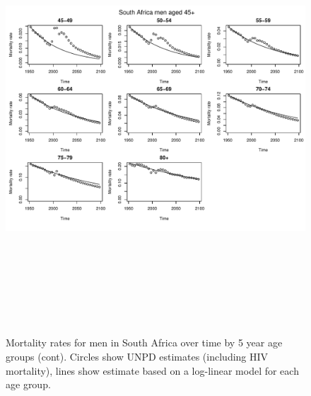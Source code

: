 \documentclass{article}
\begin{document}
\begin{figure}
\includegraphics[width=16cm,height=16cm]{EstimatingRatesFromUNPD-MortalitySAMen2} 

\caption{Mortality rates for men in South Africa over time by 5 year age groups (cont). Circles show UNPD estimates (including HIV mortality), lines show estimate based on a log-linear model for each age group.}
\label{MortalitySAmen1}
\end{figure}
\end{document}
